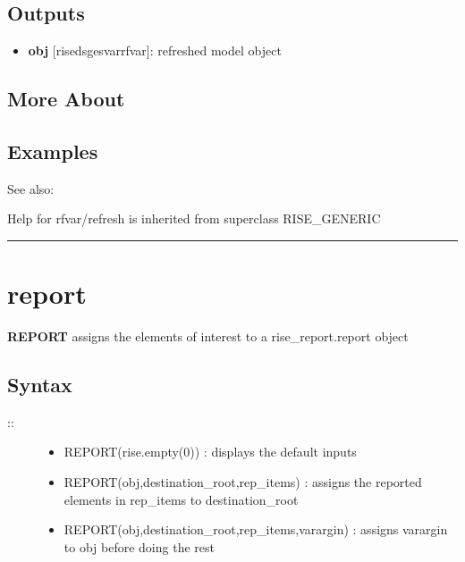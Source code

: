 \documentclass[letterpaper,10pt,english]{sphinxmanual}
\begin{document}
\subsection{Outputs}
\label{classes/models/@rfvar/rfvar:id119}\begin{itemize}
\item {} 
\textbf{obj} {[}rise\textbar{}dsge\textbar{}svar\textbar{}rfvar{]}: refreshed model object

\end{itemize}


\subsection{More About}
\label{classes/models/@rfvar/rfvar:id120}

\subsection{Examples}
\label{classes/models/@rfvar/rfvar:id121}
See also:

Help for rfvar/refresh is inherited from superclass RISE\_GENERIC


\bigskip\hrule{}\bigskip



\section{report}
\label{classes/models/@rfvar/rfvar:report}\label{classes/models/@rfvar/rfvar:id122}
\textbf{REPORT} assigns the elements of interest to a rise\_report.report object


\subsection{Syntax}
\label{classes/models/@rfvar/rfvar:id123}\begin{description}
\item[{::}] \leavevmode\begin{itemize}
\item {} 
REPORT(rise.empty(0)) : displays the default inputs

\item {} 
REPORT(obj,destination\_root,rep\_items) : assigns the reported
elements in rep\_items to destination\_root

\item {} 
REPORT(obj,destination\_root,rep\_items,varargin) : assigns varargin to
obj before doing the rest

\end{itemize}

\end{description}
\end{document}
